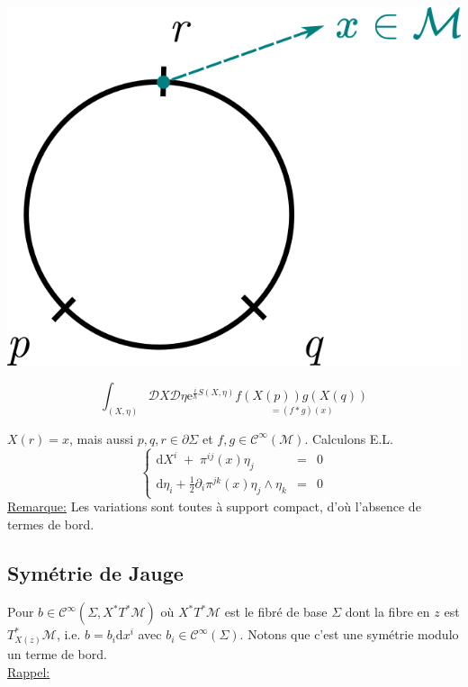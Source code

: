 \documentclass[a4paper,11pt]{article}
\renewcommand{\d}{{\mathrm{d}}}
\newcommand{\D}{{\mathcal{D}}}
\newcommand{\e}{{\mathrm{e}}}
\begin{document}
\begin{center}\begin{minipage}{.2\textwidth}\begin{center}
\includegraphics[width=.9\textwidth]{Drawings/Draw_5.png}
\end{center}
\end{minipage}\begin{minipage}{.4\textwidth}
$$\int_{(X,\eta)} \D X \D \eta \e^{\frac i\hbar S(X,\eta)} \underset{=(f*g)(x)}{f(X(p))g(X(q))}$$
\end{minipage}\end{center}
$X(r)=x$, mais aussi $p,q,r \in \partial \Sigma$ et $f,g\in\mathcal C^\infty (\mathcal{M})$. Calculons E.L.
$$\left\{\begin{matrix}
\d X^i \;+\; \pi^{ij} (x)\eta_j &=& 0\\
\d \eta_i + \frac12 \partial_i \pi^{jk}(x) \eta_j\wedge\eta_k \!\!\! &=& 0
\end{matrix}\right.$$
\underline{Remarque:} Les variations sont toutes à support compact, d'où l'absence de termes de bord.
\subsection{Symétrie de Jauge}
\quad Pour $b\in \mathcal C^\infty(\Sigma, X^*T^*\mathcal M)$ où $X^*T^*\mathcal M$ est le fibré de base $\Sigma$ dont la fibre en $z$ est $T^*_{X(z)}\mathcal{M}$, i.e. $b=b_i \d x^i$ avec $b_i \in\mathcal{C}^\infty(\Sigma)$. Notons que c'est une symétrie modulo un terme de bord.\\

\noindent\underline{Rappel:}
\end{document}
